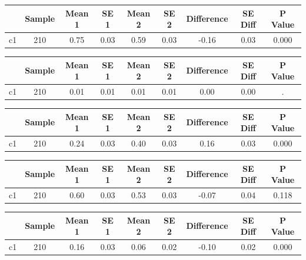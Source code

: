 {
\def\sym#1{\ifmmode^{#1}\else\(^{#1}\)\fi}
\begin{tabular}{l*{1}{cccccccc}}
\hline\hline
            &      Sample&      Mean 1&        SE 1&      Mean 2&        SE 2&  Difference&     SE Diff&     P Value\\
\hline
c1          &         210&        0.75&        0.03&        0.59&        0.03&       -0.16&        0.03&       0.000\\
\hline\hline
\end{tabular}
}
{
\def\sym#1{\ifmmode^{#1}\else\(^{#1}\)\fi}
\begin{tabular}{l*{1}{cccccccc}}
\hline\hline
            &      Sample&      Mean 1&        SE 1&      Mean 2&        SE 2&  Difference&     SE Diff&     P Value\\
\hline
c1          &         210&        0.01&        0.01&        0.01&        0.01&        0.00&        0.00&           .\\
\hline\hline
\end{tabular}
}
{
\def\sym#1{\ifmmode^{#1}\else\(^{#1}\)\fi}
\begin{tabular}{l*{1}{cccccccc}}
\hline\hline
            &      Sample&      Mean 1&        SE 1&      Mean 2&        SE 2&  Difference&     SE Diff&     P Value\\
\hline
c1          &         210&        0.24&        0.03&        0.40&        0.03&        0.16&        0.03&       0.000\\
\hline\hline
\end{tabular}
}
{
\def\sym#1{\ifmmode^{#1}\else\(^{#1}\)\fi}
\begin{tabular}{l*{1}{cccccccc}}
\hline\hline
            &      Sample&      Mean 1&        SE 1&      Mean 2&        SE 2&  Difference&     SE Diff&     P Value\\
\hline
c1          &         210&        0.60&        0.03&        0.53&        0.03&       -0.07&        0.04&       0.118\\
\hline\hline
\end{tabular}
}
{
\def\sym#1{\ifmmode^{#1}\else\(^{#1}\)\fi}
\begin{tabular}{l*{1}{cccccccc}}
\hline\hline
            &      Sample&      Mean 1&        SE 1&      Mean 2&        SE 2&  Difference&     SE Diff&     P Value\\
\hline
c1          &         210&        0.16&        0.03&        0.06&        0.02&       -0.10&        0.02&       0.000\\
\hline\hline
\end{tabular}
}
